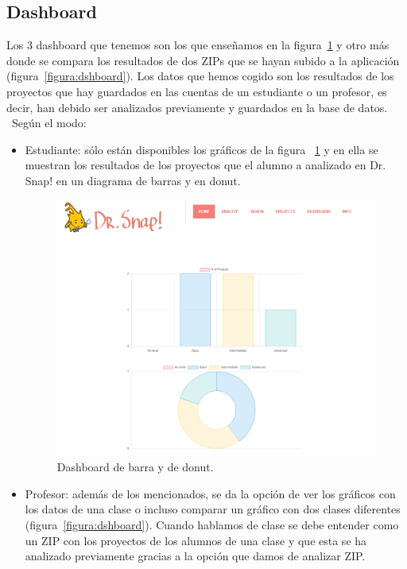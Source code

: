\documentclass[a4paper, 12pt]{book}
\begin{document}
\subsection{Dashboard}
       Los 3 dashboard que tenemos son los que enseñamos en la figura~\ref{figura:dshboard2} y otro más donde se compara los resultados de dos ZIPs que se hayan subido a la aplicación (figura~\ref{figura:dshboard}). Los datos que hemos cogido son los resultados de los proyectos que hay guardados en las cuentas de un estudiante o un profesor, es decir, han debido ser analizados previamente y guardados en la base de datos. ~Según el modo:
    \begin{itemize}
        \item Estudiante: sólo están disponibles los gráficos de la figura ~\ref{figura:dshboard2} y en ella se muestran los resultados de los proyectos que el alumno a analizado en Dr. Snap! en un diagrama de barras y en donut.\\
        \begin{figure}[h]
            \centering
            \includegraphics[scale=0.4]{img/dashboard.PNG}
            \caption{Dashboard de barra y de donut.}
            \label{figura:dshboard2}
        \end{figure}
        
        \item Profesor: además de los mencionados, se da la opción de ver los gráficos con los datos de una clase o incluso comparar un gráfico con dos clases diferentes (figura~\ref{figura:dshboard}). Cuando hablamos de clase se debe entender como un ZIP con los proyectos de los alumnos de una clase y que esta se ha analizado previamente gracias a la opción que damos de analizar ZIP.
        

\end{itemize}
\end{document}
